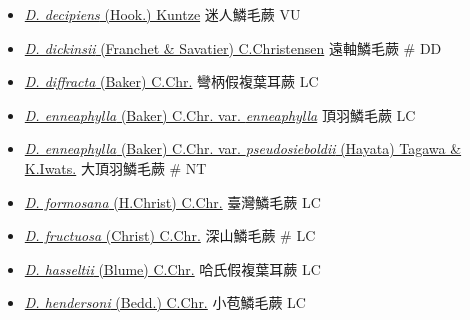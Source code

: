 \begin{itemize}
\begin{itemize}
        \item[] \href{http://www.theplantlist.org/tpl1.1/search?q=Dryopteris+decipiens}{\textit{D. decipiens} (Hook.) Kuntze}   迷人鱗毛蕨   VU
        \item[] \href{http://www.theplantlist.org/tpl1.1/search?q=Dryopteris+dickinsii}{\textit{D. dickinsii} (Franchet \& Savatier) C.Christensen}   遠軸鱗毛蕨  \# DD
        \item[] \href{http://www.theplantlist.org/tpl1.1/search?q=Dryopteris+diffracta}{\textit{D. diffracta} (Baker) C.Chr.}   彎柄假複葉耳蕨   LC
        \item[] \href{http://www.theplantlist.org/tpl1.1/search?q=Dryopteris+enneaphylla+var.+enneaphylla}{\textit{D. enneaphylla} (Baker) C.Chr. var. \textit{enneaphylla}}  
                                        頂羽鱗毛蕨   LC
        \item[] \href{http://www.theplantlist.org/tpl1.1/search?q=Dryopteris+enneaphylla+var.+pseudosieboldii}{\textit{D. enneaphylla} (Baker) C.Chr. var. \textit{pseudosieboldii} (Hayata) Tagawa \& K.Iwats.}  
                                        大頂羽鱗毛蕨  \# NT
        \item[] \href{http://www.theplantlist.org/tpl1.1/search?q=Dryopteris+formosana}{\textit{D. formosana} (H.Christ) C.Chr.}   臺灣鱗毛蕨   LC
        \item[] \href{http://www.theplantlist.org/tpl1.1/search?q=Dryopteris+fructuosa}{\textit{D. fructuosa} (Christ) C.Chr.}   深山鱗毛蕨  \# LC
        \item[] \href{http://www.theplantlist.org/tpl1.1/search?q=Dryopteris+hasseltii}{\textit{D. hasseltii} (Blume) C.Chr.}   哈氏假複葉耳蕨   LC
        \item[] \href{http://www.theplantlist.org/tpl1.1/search?q=Dryopteris+hendersoni}{\textit{D. hendersoni} (Bedd.) C.Chr.}   小苞鱗毛蕨   LC

\end{itemize}
\end{itemize}
